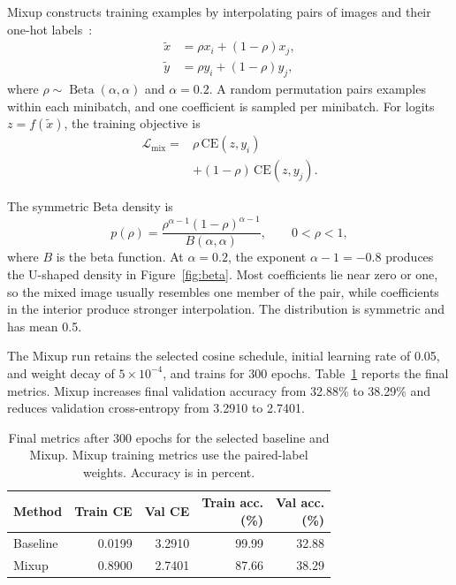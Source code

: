 \documentclass[letterpaper]{article}
\begin{document}
Mixup constructs training examples by interpolating pairs of images and their one-hot labels~\citep{zhang2018mixup}:
\begin{equation}
\begin{aligned}
\widetilde{x}&=\rho x_i+(1-\rho)x_j,\\
\widetilde{y}&=\rho y_i+(1-\rho)y_j,
\end{aligned}
\label{eq:mixup}
\end{equation}
where $\rho\sim\operatorname{Beta}(\alpha,\alpha)$ and $\alpha=0.2$. A random permutation pairs examples within each minibatch, and one coefficient is sampled per minibatch. For logits $z=f(\widetilde{x})$, the training objective is
\begin{equation}
\begin{aligned}
\mathcal{L}_{\mathrm{mix}}={}&\rho\,\mathrm{CE}(z,y_i)\\
&+(1-\rho)\,\mathrm{CE}(z,y_j).
\end{aligned}
\label{eq:mixup-loss}
\end{equation}

The symmetric Beta density is
\begin{equation}
p(\rho)=\frac{\rho^{\alpha-1}(1-\rho)^{\alpha-1}}
{B(\alpha,\alpha)},\qquad 0<\rho<1,
\label{eq:beta}
\end{equation}
where $B$ is the beta function. At $\alpha=0.2$, the exponent $\alpha-1=-0.8$ produces the U-shaped density in Figure~\ref{fig:beta}. Most coefficients lie near zero or one, so the mixed image usually resembles one member of the pair, while coefficients in the interior produce stronger interpolation. The distribution is symmetric and has mean 0.5.

The Mixup run retains the selected cosine schedule, initial learning rate of 0.05, and weight decay of $5\times10^{-4}$, and trains for 300 epochs. Table~\ref{tab:mixup} reports the final metrics. Mixup increases final validation accuracy from 32.88\% to 38.29\% and reduces validation cross-entropy from 3.2910 to 2.7401.

\begin{table}[ht]
\centering
\caption{Final metrics after 300 epochs for the selected baseline and Mixup. Mixup training metrics use the paired-label weights. Accuracy is in percent.}
\label{tab:mixup}
\begin{tabular}{@{}lrrrr@{}}
\toprule
Method & Train CE & Val CE & \shortstack{Train acc.\\(\%)} & \shortstack{Val acc.\\(\%)} \\
\midrule
Baseline & 0.0199 & 3.2910 & 99.99 & 32.88 \\
Mixup & 0.8900 & 2.7401 & 87.66 & 38.29 \\
\bottomrule
\end{tabular}
\end{table}
\end{document}
